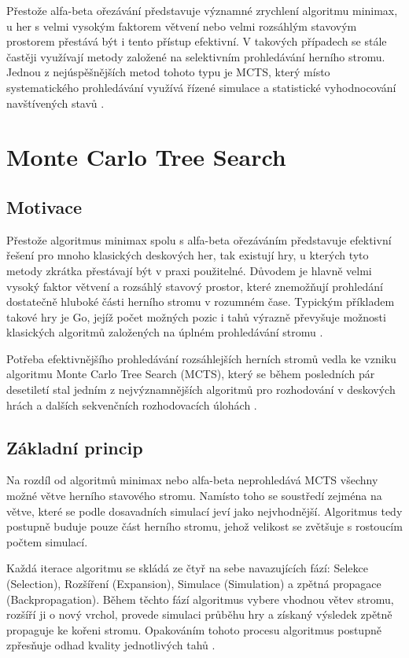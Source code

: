 Přestože alfa-beta ořezávání představuje významné zrychlení algoritmu minimax, u her s velmi vysokým faktorem větvení nebo velmi
rozsáhlým stavovým prostorem přestává být i tento přístup efektivní. V takových případech se stále častěji využívají metody
založené na selektivním prohledávání herního stromu. Jednou z nejúspěšnějších metod tohoto typu je MCTS,
který místo systematického prohledávání využívá řízené simulace a statistické vyhodnocování navštívených stavů \cite{browne2012mcts}.

\section{Monte Carlo Tree Search}
\label{sec:mcts}

\subsection{Motivace}

Přestože algoritmus minimax spolu s alfa-beta ořezáváním představuje efektivní řešení pro mnoho klasických deskových her, tak
existují hry, u kterých tyto metody zkrátka přestávají být v praxi použitelné. Důvodem je hlavně velmi vysoký faktor větvení a 
rozsáhlý stavový prostor, které znemožňují prohledání dostatečně hluboké části herního stromu v rozumném čase. Typickým příkladem
takové hry je Go, jejíž počet možných pozic i tahů výrazně převyšuje možnosti klasických algoritmů založených na úplném prohledávání 
stromu \cite{browne2012mcts}.

Potřeba efektivnějšího prohledávání rozsáhlejších herních stromů vedla ke vzniku algoritmu Monte Carlo Tree Search (MCTS), který se během
posledních pár desetiletí stal jedním z nejvýznamnějších algoritmů pro rozhodování v deskových hrách a dalších sekvenčních rozhodovacích
úlohách \cite{browne2012mcts}.

\subsection{Základní princip}

Na rozdíl od algoritmů minimax nebo alfa-beta neprohledává MCTS všechny možné větve herního stavového stromu. 
Namísto toho se soustředí zejména na větve, které se podle dosavadních simulací jeví jako nejvhodnější. Algoritmus
tedy postupně buduje pouze část herního stromu, jehož velikost se zvětšuje s rostoucím počtem simulací.

Každá iterace algoritmu se skládá ze čtyř na sebe navazujících fází: Selekce (Selection), Rozšíření (Expansion), Simulace (Simulation) 
a zpětná propagace (Backpropagation).
Během těchto fází algoritmus vybere vhodnou větev stromu, rozšíří ji o nový vrchol, provede simulaci průběhu hry a získaný 
výsledek zpětně propaguje ke kořeni stromu. Opakováním tohoto procesu algoritmus postupně zpřesňuje odhad kvality jednotlivých tahů \cite{browne2012mcts}.


